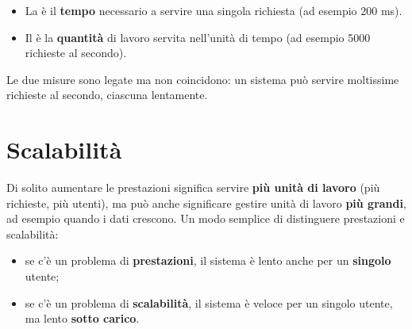 \begin{center}
\end{center}

\begin{itemize}
  \item La  è il \textbf{tempo} necessario a servire una singola richiesta (ad esempio 200 ms).
  \item Il  è la \textbf{quantità} di lavoro servita nell'unità di tempo (ad esempio 5000 richieste al
        secondo).
\end{itemize}
Le due misure sono legate ma non coincidono: un sistema può servire moltissime richieste al secondo, ciascuna lentamente.

\section{Scalabilità}


Di solito aumentare le prestazioni significa servire \textbf{più unità di lavoro} (più richieste, più utenti), ma può anche
significare gestire unità di lavoro \textbf{più grandi}, ad esempio quando i dati crescono. Un modo semplice di distinguere
prestazioni e scalabilità:
\begin{itemize}
  \item se c'è un problema di \textbf{prestazioni}, il sistema è lento anche per un \textbf{singolo} utente;
  \item se c'è un problema di \textbf{scalabilità}, il sistema è veloce per un singolo utente, ma lento \textbf{sotto carico}.
\end{itemize}

